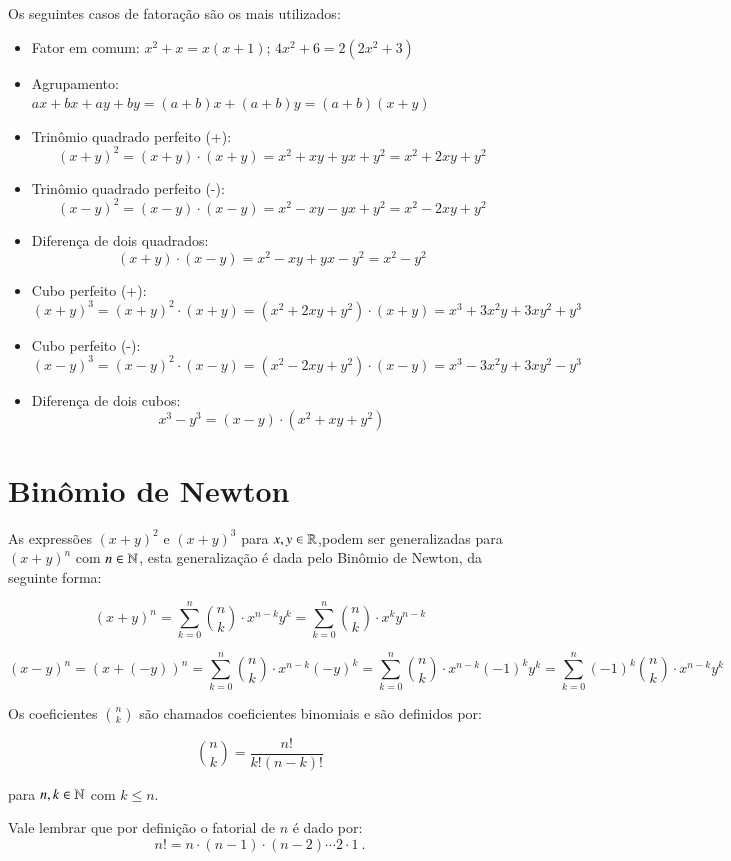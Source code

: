  Os seguintes casos de fatoração são os mais utilizados:
 \begin{itemize}
  \item Fator em comum: $x^2 + x= x(x + 1)$; $4x^2 + 6= 2(2x^2 + 3)$
  \item Agrupamento: $ax + bx + ay + by= (a+b)x+(a+b)y= (a+b)(x+y)$
  \item Trinômio quadrado perfeito (+): 
  \[(x + y)^2= (x+y) \cdot (x+y)= x^2 + xy + yx + y^2= x^2 + 2xy + y^2\]
  \item Trinômio quadrado perfeito (-): 
  \[(x - y)^2= (x - y) \cdot (x - y)= x^2 - xy - yx + y^2 = x^2 - 2xy + y^2\]
  \item Diferença de dois quadrados: 
  \[(x + y) \cdot (x - y)= x^2 - xy + yx - y^2 = x^2 - y^2\]
  \item Cubo perfeito (+): 
  \[(x+y)^3= (x+y)^2 \cdot (x+y)= (x^2 + 2xy + y^2) \cdot (x+y)  =x^3 + 3x^2y + 3xy^2 + y^3\]
  \item Cubo perfeito (-): 
  \[(x-y)^3= (x-y)^2 \cdot (x-y)= (x^2 - 2xy + y^2) \cdot (x-y)= x^3 - 3x^2y + 3xy^2 - y^3\]
  \item Diferença de dois cubos:
  \[x^3 - y^3= (x-y) \cdot (x^2 + xy + y^2)\]
 \end{itemize}
 
 \section{Binômio de Newton}
 
 As expressões $(x + y)^2$ e $(x + y)^3$ para $x, y \in \mathbb{R}$,podem ser generalizadas para $(x + y)^n$ com $n \in \mathbb{N}$, esta generalização é dada pelo Binômio de Newton, da seguinte forma:
 
 \[(x + y)^n= \sum^{n}_{k=0} \binom{n}{k} \cdot x^{n-k} y^{k}= \sum^{n}_{k=0} \binom{n}{k} \cdot x^{k} y^{n-k} \]
 
 \[(x - y)^n= (x +(-y))^n= \sum^{n}_{k=0} \binom{n}{k} \cdot x^{n-k} (-y)^{k}= \sum^{n}_{k=0} \binom{n}{k} \cdot x^{n-k} (-1)^{k}y^{k}= \sum^{n}_{k=0} (-1)^{k} \binom{n}{k} \cdot x^{n-k} y^{k}\]
 
 Os coeficientes $\binom{n}{k}$ são chamados coeficientes binomiais e são definidos por:
 
 \[\binom{n}{k}= \frac{n!}{k!(n-k)!}\]

 para $n, k \in \mathbb{N}$ com $k \leq n$. 
 
 Vale lembrar que por definição o fatorial de $n$ é dado por:
 \[n!= n \cdot (n-1) \cdot (n-2) \cdots 2 \cdot 1 \ .\]

